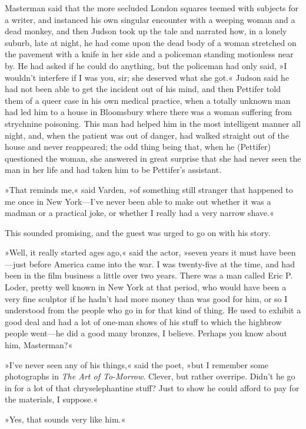 Masterman said that the more secluded London squares teemed with subjects for a writer, and instanced his own singular encounter with a weeping woman and a dead monkey, and then Judson took up the tale and narrated how, in a lonely suburb, late at night, he had come upon the dead body of a woman stretched on the pavement with a knife in her side and a policeman standing motionless near by. He had asked if he could do anything, but the policeman had only said, »I wouldn't interfere if I was you, sir; she deserved what she got.« Judson said he had not been able to get the incident out of his mind, and then Pettifer told them of a queer case in his own medical practice, when a totally unknown man had led him to a house in Bloomsbury where there was a woman suffering from strychnine poisoning. This man had helped him in the most intelligent manner all night, and, when the patient was out of danger, had walked straight out of the house and never reappeared; the odd thing being that, when he (Pettifer) questioned the woman, she answered in great surprise that she had never seen the man in her life and had taken him to be Pettifer's assistant.

»That reminds me,« said Varden, »of something still stranger that happened to me once in New York—I've never been able to make out whether it was a madman or a practical joke, or whether I really had a very narrow shave.«

This sounded promising, and the guest was urged to go on with his story.

»Well, it really started ages ago,« said the actor, »seven years it must have been—just before America came into the war. I was twenty-five at the time, and had been in the film business a little over two years. There was a man called Eric P. Loder, pretty well known in New York at that period, who would have been a very fine sculptor if he hadn't had more money than was good for him, or so I understood from the people who go in for that kind of thing. He used to exhibit a good deal and had a lot of one-man shows of his stuff to which the highbrow people went—he did a good many bronzes, I believe. Perhaps you know about him, Masterman?«

»I've never seen any of his things,« said the poet, »but I remember some photographs in \textit{The Art of To-Morrow}. Clever, but rather overripe. Didn't he go in for a lot of that chryselephantine stuff? Just to show he could afford to pay for the materials, I suppose.«

»Yes, that sounds very like him.«

